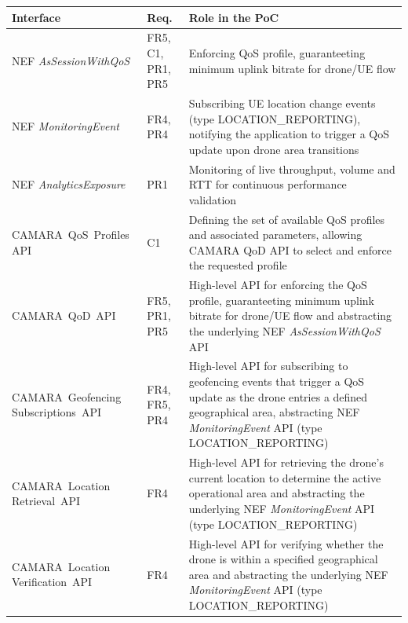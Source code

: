 
\begin{table}[ht]
\centering
\small
\renewcommand{\arraystretch}{1.3}
\begin{tabular}{p{3.9cm} p{1.4cm} p{8.1cm}}
\toprule
\textbf{Interface} & \textbf{Req.} & \textbf{Role in the \acs{PoC}} \\
\midrule
\parbox[t]{3.9cm}{\acs{NEF} \textit{AsSessionWithQoS}} & FR5, C1, PR1, PR5 & Enforcing \acs{QoS} profile, guaranteeting minimum uplink bitrate for drone/\acs{UE} flow \\
\parbox[t]{3.9cm}{\acs{NEF} \textit{MonitoringEvent}} & FR4, PR4 & Subscribing \acs{UE} location change events (type LOCATION\_REPORTING), notifying the application to trigger a \acs{QoS} update upon drone area transitions \\
\parbox[t]{3.9cm}{\acs{NEF} \textit{AnalyticsExposure}} & PR1 & Monitoring of live throughput, volume and \acs{RTT} for continuous performance validation \\
\mbox{CAMARA \acs{QoS} Profiles} \acs{API} & C1 & Defining the set of available \acs{QoS} profiles and associated parameters, allowing CAMARA \acs{QoD} \acs{API} to select and enforce the requested profile \\
\mbox{CAMARA \acs{QoD} \acs{API}} & FR5, PR1, PR5 & High-level \acs{API} for enforcing the \acs{QoS} profile, guaranteeting minimum uplink bitrate for drone/\acs{UE} flow and abstracting the underlying \acs{NEF} \textit{AsSessionWithQoS} \acs{API} \\
\mbox{CAMARA Geofencing} \mbox{Subscriptions \acs{API}} & FR4, FR5, PR4 & High-level \acs{API} for subscribing to geofencing events that trigger a \acs{QoS} update as the drone entries a defined geographical area, abstracting \acs{NEF} \textit{MonitoringEvent} \acs{API} (type LOCATION\_REPORTING) \\
\mbox{CAMARA Location} \mbox{Retrieval \acs{API}} & FR4 & High-level \acs{API} for retrieving the drone's current location to determine the active operational area and abstracting the underlying \acs{NEF} \textit{MonitoringEvent} \acs{API} (type LOCATION\_REPORTING)  \\
\mbox{CAMARA Location} \mbox{Verification \acs{API}} & FR4 & High-level \acs{API} for verifying whether the drone is within a specified geographical area and abstracting the underlying \acs{NEF} \textit{MonitoringEvent} \acs{API} (type LOCATION\_REPORTING)  \\

\end{tabular}
\end{table}
